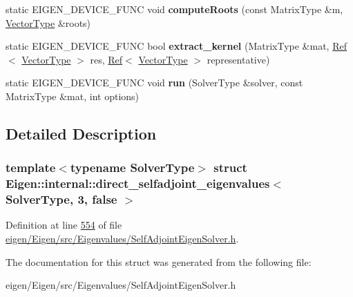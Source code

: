 \begin{DoxyCompactItemize}
static E\+I\+G\+E\+N\+\_\+\+D\+E\+V\+I\+C\+E\+\_\+\+F\+U\+NC void {\bfseries compute\+Roots} (const Matrix\+Type \&m, \hyperlink{struct_vector_type}{Vector\+Type} \&roots)
\item 
\mbox{\label{struct_eigen_1_1internal_1_1direct__selfadjoint__eigenvalues_3_01_solver_type_00_013_00_01false_01_4_acd33edc4fec6df2b006ffcdd610f0a3b}} 
static E\+I\+G\+E\+N\+\_\+\+D\+E\+V\+I\+C\+E\+\_\+\+F\+U\+NC bool {\bfseries extract\+\_\+kernel} (Matrix\+Type \&mat, \hyperlink{group___core___module_class_eigen_1_1_ref}{Ref}$<$ \hyperlink{struct_vector_type}{Vector\+Type} $>$ res, \hyperlink{group___core___module_class_eigen_1_1_ref}{Ref}$<$ \hyperlink{struct_vector_type}{Vector\+Type} $>$ representative)
\item 
\mbox{\label{struct_eigen_1_1internal_1_1direct__selfadjoint__eigenvalues_3_01_solver_type_00_013_00_01false_01_4_a9bba7b5bd5aeb6d3ede0cd70ed18f231}} 
static E\+I\+G\+E\+N\+\_\+\+D\+E\+V\+I\+C\+E\+\_\+\+F\+U\+NC void {\bfseries run} (Solver\+Type \&solver, const Matrix\+Type \&mat, int options)
\end{DoxyCompactItemize}


\subsection{Detailed Description}
\subsubsection*{template$<$typename Solver\+Type$>$\newline
struct Eigen\+::internal\+::direct\+\_\+selfadjoint\+\_\+eigenvalues$<$ Solver\+Type, 3, false $>$}



Definition at line \hyperlink{eigen_2_eigen_2src_2_eigenvalues_2_self_adjoint_eigen_solver_8h_source_l00554}{554} of file \hyperlink{eigen_2_eigen_2src_2_eigenvalues_2_self_adjoint_eigen_solver_8h_source}{eigen/\+Eigen/src/\+Eigenvalues/\+Self\+Adjoint\+Eigen\+Solver.\+h}.



The documentation for this struct was generated from the following file\+:\begin{DoxyCompactItemize}
\item 
eigen/\+Eigen/src/\+Eigenvalues/\+Self\+Adjoint\+Eigen\+Solver.\+h\end{DoxyCompactItemize}
